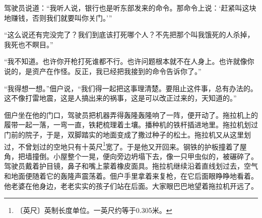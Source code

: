 \documentclass[12pt,UTF-8,openany]{ctexbook}
\begin{document}
    驾驶员说道：“我听人说，银行也是听东部发来的命令。那命令上说：‘赶紧叫这块地赚钱，否则我们就要叫你关门。’”
    
    “这么说还有完没完了？我们到底该打死哪个人？不先把那个叫我饿死的人杀掉，我死也不瞑目。”
    
    “我不知道。也许你开枪打死谁都不行。也许问题根本就不在人身上。也许就像你说的，是资产在作怪。反正，我已经把我接到的命令告诉你了。”
    
    “我得想一想。”佃户说，“我们得一起把这事理清楚。要阻止这件事，总有办法的。这不像打雷地震，这是人搞出来的祸事，这是可以改正过来的，天知道的。”
    
    佃户坐在他的门口，驾驶员把机器弄得轰隆轰隆响了一阵，便开动了。拖拉机上的履带一起一落，一弯一直，铁耙梳理着土壤。播种机的铁杆插进地里。拖拉机划过门前的院子，于是，双脚踏实的地面变成了撒过种子的松土。拖拉机又从这里划过，不曾划过的空地只有十英尺\footnote{〔英尺〕英制长度单位。一英尺约等于0.305米。}宽了。于是他又开回来。钢铁的护板撞着了屋角，把墙撞倒。小屋整个一晃，便向旁边坍塌下去，像一只甲虫似的，被碾碎了。驾驶员戴着护目镜，鼻子和嘴上蒙着橡皮面具。拖拉机继续沿着直线划过去，空气和地面便随着它的轰隆声震荡着。佃户手里拿着来复枪，在它后面眼睁睁地看着。他老婆在他身边，老老实实的孩子们站在后面。大家眼巴巴地望着拖拉机开远了。
\end{document}
